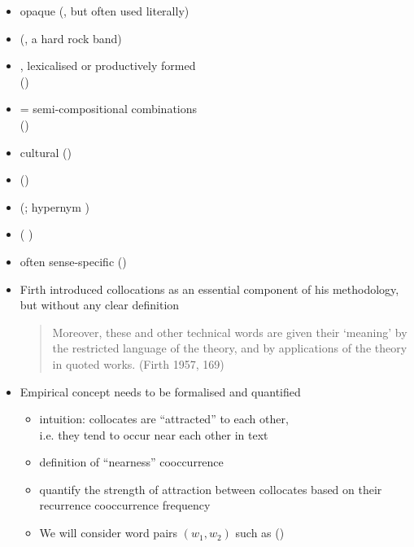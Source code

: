 \documentclass[a4paper,landscape,headrule,footrule,xetex]{foils}
\begin{document}
 
\begin{itemize}
\item opaque  
  (, but often used literally)
\item {} 
  (, a hard rock band)
\item {}, lexicalised or productively formed
\\()
\item {} = semi-compositional combinations
\\()
\item cultural  
  ()
\item {} ()
\item {} (; hypernym )
\item {} ( )
\item often sense-specific ()
\end{itemize}

\begin{itemize}
\item Firth introduced collocations as an essential component of
his methodology, but without any clear definition
\begin{quote}
  Moreover, these and other technical words are given their ‘meaning'
  by the restricted language of the theory, and by applications of the
  theory in quoted works. (Firth 1957, 169)
\end{quote}
\item Empirical concept needs to be formalised and quantified
  \begin{itemize}%
  \item intuition: collocates are “attracted” to each other, 
    \\ i.e. they tend to occur near each other in text
  \item definition of “nearness” \into cooccurrence
  \item quantify the strength of attraction between collocates based
    on their recurrence \into cooccurrence frequency
\item We will consider word pairs $(w_1, w_2)$ such as 
()

\end{itemize}
  \end{itemize}
\end{document}
